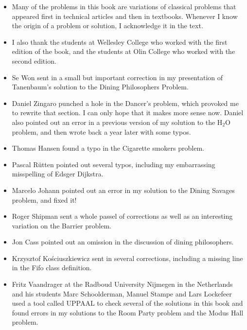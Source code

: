 \documentclass{book}
\begin{document}
\begin{itemize}

    \item Many of the problems in this book are variations of classical
          problems that appeared first in technical articles and then in textbooks.
          Whenever I know the origin of a problem or solution, I acknowledge it
          in the text.

    \item I also thank the students at Wellesley College who worked with
          the first edition of the book, and the students at Olin College who
          worked with the second edition.

    \item Se Won sent in a small but important correction in my presentation
          of Tanenbaum's solution to the Dining Philosophers Problem.

    \item Daniel Zingaro punched a hole in the Dancer's problem, which
          provoked me to rewrite that section.  I can only hope that it makes more
          sense now.  Daniel also pointed out an error in a previous version of
          my solution to the H$_2$O problem, and then wrote back a year later
          with some typos.

    \item Thomas Hansen found a typo in the Cigarette smokers problem.

    \item Pascal R\"{u}tten pointed out several typos, including my embarrassing
          misspelling of Edsger Dijkstra.

    \item Marcelo Johann pointed out an error in my solution to the
          Dining Savages problem, and fixed it!

    \item Roger Shipman sent a whole passel of corrections as well as
          an interesting variation on the Barrier problem.

    \item Jon Cass pointed out an omission in the discussion of dining
          philosophers.

    \item Krzysztof Ko\'{s}ciuszkiewicz sent in several corrections, including
          a missing line in the Fifo class definition.

    \item Fritz Vaandrager at the Radboud University Nijmegen in the
          Netherlands and his students Marc Schoolderman, Manuel Stampe and Lars
          Lockefeer used a tool called UPPAAL to check several of the solutions
          in this book and found errors in my solutions to the Room Party problem
          and the Modus Hall problem.


\end{itemize}
\end{document}

